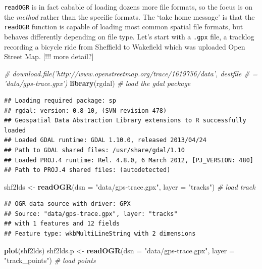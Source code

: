 \documentclass[]{article}
\newenvironment{Shaded}{}{}
\newcommand{\KeywordTok}[1]{\textcolor[rgb]{0.00,0.44,0.13}{\textbf{{#1}}}}
\newcommand{\DataTypeTok}[1]{\textcolor[rgb]{0.56,0.13,0.00}{{#1}}}
\newcommand{\StringTok}[1]{\textcolor[rgb]{0.25,0.44,0.63}{{#1}}}
\newcommand{\CommentTok}[1]{\textcolor[rgb]{0.38,0.63,0.69}{\textit{{#1}}}}
\newcommand{\NormalTok}[1]{{#1}}
\begin{document}
\texttt{readOGR} is in fact cabable of loading dozens more file formats,
so the focus is on the \emph{method} rather than the specific formats.
The `take home message' is that the \texttt{readOGR} function is capable
of loading most common spatial file formats, but behaves differently
depending on file type. Let's start with a \texttt{.gpx} file, a
tracklog recording a bicycle ride from Sheffield to Wakefield which was
uploaded Open Street Map. {[}!!! more detail?{]}

\begin{Shaded}
\begin{Highlighting}[]
\CommentTok{# download.file('http://www.openstreetmap.org/trace/1619756/data', destfile}
\CommentTok{# = 'data/gps-trace.gpx')}
\KeywordTok{library}\NormalTok{(rgdal)  }\CommentTok{# load the gdal package}
\end{Highlighting}
\end{Shaded}
\begin{verbatim}
## Loading required package: sp
## rgdal: version: 0.8-10, (SVN revision 478)
## Geospatial Data Abstraction Library extensions to R successfully loaded
## Loaded GDAL runtime: GDAL 1.10.0, released 2013/04/24
## Path to GDAL shared files: /usr/share/gdal/1.10
## Loaded PROJ.4 runtime: Rel. 4.8.0, 6 March 2012, [PJ_VERSION: 480]
## Path to PROJ.4 shared files: (autodetected)
\end{verbatim}
\begin{Shaded}
\begin{Highlighting}[]
\NormalTok{shf2lds <- }\KeywordTok{readOGR}\NormalTok{(}\DataTypeTok{dsn =} \StringTok{"data/gps-trace.gpx"}\NormalTok{, }\DataTypeTok{layer =} \StringTok{"tracks"}\NormalTok{)  }\CommentTok{# load track}
\end{Highlighting}
\end{Shaded}
\begin{verbatim}
## OGR data source with driver: GPX 
## Source: "data/gps-trace.gpx", layer: "tracks"
## with 1 features and 12 fields
## Feature type: wkbMultiLineString with 2 dimensions
\end{verbatim}
\begin{Shaded}
\begin{Highlighting}[]
\KeywordTok{plot}\NormalTok{(shf2lds)}
\NormalTok{shf2lds.p <- }\KeywordTok{readOGR}\NormalTok{(}\DataTypeTok{dsn =} \StringTok{"data/gps-trace.gpx"}\NormalTok{, }\DataTypeTok{layer =} \StringTok{"track_points"}\NormalTok{)  }\CommentTok{# load points}
\end{Highlighting}
\end{Shaded}
\end{document}
